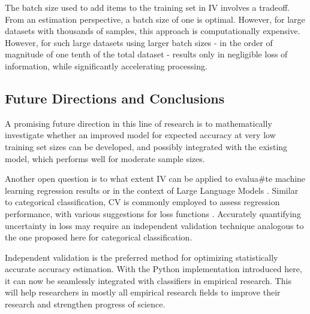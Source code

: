 \documentclass[man]{apa7}
\begin{document}
The batch size used to add items to the training set in IV involves a tradeoff. From an estimation perspective, a batch size of one is optimal. However, for large datasets with thousands of samples, this approach is computationally expensive. However, for such large datasets using larger batch sizes - in the order of magnitude of one tenth of the total dataset - results only in negligible loss of information, while significantly accelerating processing.

\subsection{Future Directions and Conclusions} \label{sec:future_conclusions}
A promising future direction in this line of research is to mathematically investigate whether an improved model for expected accuracy at very low training set sizes can be developed, and possibly integrated with the existing model, which performs well for moderate sample sizes.

Another open question is to what extent IV can be applied to evalua#te machine learning regression results or in the context of Large Language Models \citep{touvron_llama:_2023}. Similar to categorical classification, CV is commonly employed to assess regression performance, with various suggestions for loss functions \citep{picard_cross-validation_1984}. Accurately quantifying uncertainty in loss may require an independent validation technique analogous to the one proposed here for categorical classification.

Independent validation is the preferred method for optimizing statistically accurate accuracy estimation. With the Python implementation introduced here, it can now be seamlessly integrated with classifiers in empirical research. This will help researchers in mostly all empirical research fields to improve their research and strengthen progress of science.


\end{document}
